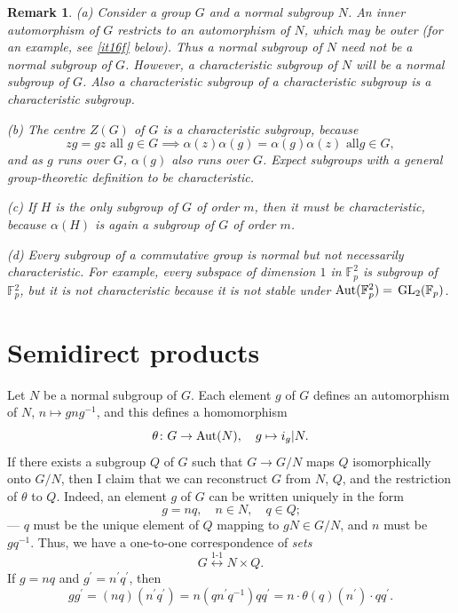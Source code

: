 \documentclass[a4paper,11pt,final]{memoir}%
\newtheorem{remark}[X]{Remark}
\theoremstyle{nonumberplain}
\begin{document}
\begin{remark}
\label{it12} (a) Consider a group $G$ and a normal subgroup $N$. An inner
automorphism of $G$ restricts to an automorphism of $N$, which may be outer
(for an example, see \ref{it16f} below). Thus a normal subgroup of $N$ need
not be a normal subgroup of $G$. However, a characteristic subgroup of $N$
will be a normal subgroup of $G$. Also a characteristic subgroup of a
characteristic subgroup is a characteristic subgroup.

(b) The centre $Z(G)$ of $G$ is a characteristic subgroup, because
\[
zg=gz\text{ all }g\in G\implies\alpha(z)\alpha(g)=\alpha(g)\alpha(z)\text{ all
}g\in G,
\]
and as $g$ runs over $G$, $\alpha(g)$ also runs over $G$. Expect subgroups
with a general group-theoretic definition to be characteristic.

(c) If $H$ is the only subgroup of $G$ of order $m$, then it must be
characteristic, because $\alpha(H)$ is again a subgroup of $G$ of order $m$.

(d) Every subgroup of a commutative group is normal but not necessarily
characteristic. For example, every subspace of dimension $1$ in $\mathbb{F}%
_{p}^{2}$ is subgroup of $\mathbb{F}{}_{p}^{2}$, but it is not characteristic
because it is not stable under $\operatorname{Aut}(\mathbb{F}{}_{p}^{2})=$ $\GL_{2}%
(\mathbb{F}_{p})$.
\end{remark}

\section{Semidirect products}

Let $N$ be a normal subgroup of $G$. Each element $g$ of $G$ defines an
automorphism of $N$, $n\mapsto gng^{-1}$, and this defines a homomorphism
\[
\theta\colon G\rightarrow\operatorname{Aut}(N),\quad g\mapsto i_{g}|N.
\]
If there exists a subgroup $Q$ of $G$ such that $G\rightarrow G/N$ maps $Q$
isomorphically onto $G/N$, then I claim that we can reconstruct $G$ from $N$,
$Q$, and the restriction of $\theta$ to $Q$. Indeed, an element $g$ of $G$ can
be written uniquely in the form%
\[
g=nq,\quad n\in N,\quad q\in Q\text{;}%
\]
--- $q$ must be the unique element of $Q$ mapping to $gN\in G/N$, and $n$ must
be $gq^{-1}$. Thus, we have a one-to-one correspondence of \textit{sets}
\[
G\overset{\text{1-1}}{\longleftrightarrow}N\times Q.
\]
If $g=nq$ and $g^{\prime}=n^{\prime}q^{\prime}$, then
\[
gg^{\prime}=\left(  nq\right)  \left(  n^{\prime}q^{\prime}\right)
=n(qn^{\prime}q^{-1})qq^{\prime}=n\cdot\theta(q)(n^{\prime})\cdot qq^{\prime
}.
\]
\end{document}
